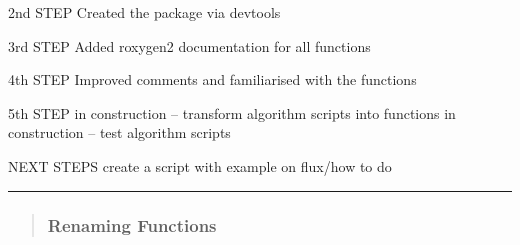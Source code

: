 \documentclass[
]{article}
\begin{document}
2nd STEP Created the package via devtools

3rd STEP Added roxygen2 documentation for all functions

4th STEP Improved comments and familiarised with the functions

5th STEP in construction -- transform algorithm scripts into functions
in construction -- test algorithm scripts

NEXT STEPS create a script with example on flux/how to do

\begin{center}\rule{0.5\linewidth}{0.5pt}\end{center}

\begin{quote}
\hypertarget{renaming-functions}{%
\subsubsection{\texorpdfstring{\textbf{Renaming
Functions}}{Renaming Functions}}\label{renaming-functions}}
\end{quote}
\end{document}
